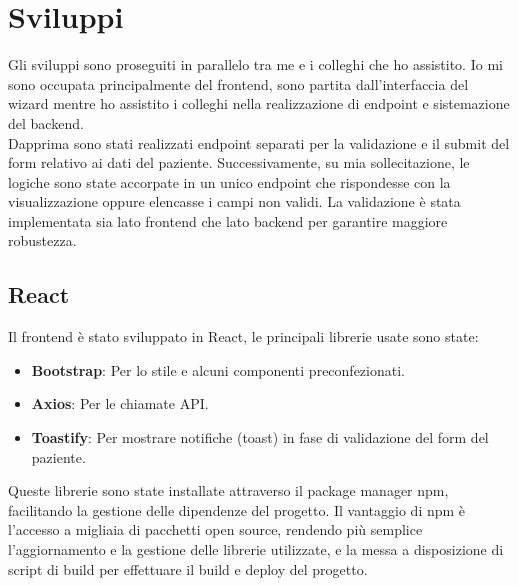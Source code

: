 \section{Sviluppi}
Gli sviluppi sono proseguiti in parallelo tra me e i colleghi che ho assistito. Io mi sono occupata principalmente del frontend, sono partita dall'interfaccia del wizard mentre ho assistito i colleghi nella realizzazione di endpoint e sistemazione del backend.\\
Dapprima sono stati realizzati endpoint separati per la validazione e il submit del form relativo ai dati del paziente. Successivamente, su mia sollecitazione, le logiche sono state accorpate in un unico endpoint che rispondesse con la visualizzazione oppure elencasse i campi non validi. La validazione è stata implementata sia lato frontend che lato backend per garantire maggiore robustezza.\\

\subsection{React}
Il frontend è stato sviluppato in React, le principali librerie usate sono state:
\begin{itemize}
    \item \textbf{Bootstrap}: Per lo stile e alcuni componenti preconfezionati.
    \item \textbf{Axios}: Per le chiamate API.
    \item \textbf{Toastify}: Per mostrare notifiche (toast) in fase di validazione del form del paziente.
\end{itemize}

Queste librerie sono state installate attraverso il package manager npm, facilitando la gestione delle dipendenze del progetto. Il vantaggio di npm è l'accesso a migliaia di pacchetti open source, rendendo più semplice l'aggiornamento e la gestione delle librerie utilizzate, e la messa a disposizione di script di build per effettuare il build e deploy del progetto. 

